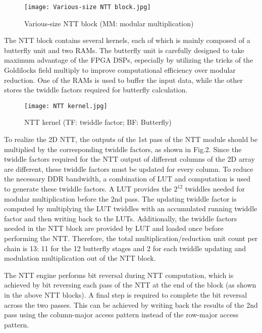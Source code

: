 \begin{figure}[ht]
  \centering
  \texttt{[image: Various-size NTT block.jpg]}
  \caption{Various-size NTT block (MM: modular multiplication)}
  \label{fig:NTT_module}
\end{figure}

The NTT block contains several kernels, each of which is mainly composed of a butterfly unit and two RAMs. The butterfly unit is carefully designed to take maximum advantage of the FPGA DSPs, especially by utilizing the tricks of the Goldilocks field multiply to improve computational efficiency over modular reduction. One of the RAMs is used to buffer the input data, while the other stores the twiddle factors required for butterfly calculation.


\begin{figure}[ht]
  \centering
  \texttt{[image: NTT kernel.jpg]}
  \caption{NTT kernel (TF: twiddle factor; BF: Butterfly)}
  \label{fig:NTT_kernel}
\end{figure}


To realize the 2D NTT, the outputs of the 1st pass of the NTT module should be multiplied by the corresponding twiddle factors, as shown in Fig.2. Since the twiddle factors required for the NTT output of different columns of the 2D array are different, these twiddle factors must be updated for every column. To reduce the necessary DDR bandwidth, a combination of LUT and computation is used to generate these twiddle factors. A LUT provides the $2^{12}$ twiddles needed for modular multiplication before the 2nd pass. The updating twiddle factor is computed by multiplying the LUT twiddles with an accumulated running twiddle factor and then writing back to the LUTs. Additionally, the twiddle factors needed in the NTT block are provided by LUT and loaded once before performing the NTT. Therefore, the total multiplication/reduction unit count per chain is 13: 11 for the 12 butterfly stages and 2 for each twiddle updating and modulation multiplication out of the NTT block.

The NTT engine performs bit reversal during NTT computation, which is achieved by bit reversing each pass of the NTT at the end of the block (as shown in the above NTT blocks). A final step is required to complete the bit reversal across the two passes. This can be achieved by writing back the results of the 2nd pass using the column-major access pattern instead of the row-major access pattern.


